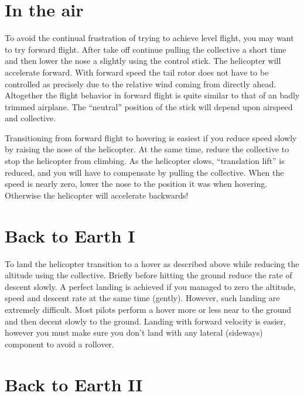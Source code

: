 \section{In the air}
 
To avoid the continual frustration of trying to achieve level flight, you may 
want to try forward flight. After take off continue pulling the collective a 
short time and then lower the nose a slightly using the control stick. The 
helicopter will accelerate forward. With forward speed the tail rotor does not 
have to be controlled as precisely due to the relative wind coming from 
directly ahead. Altogether the flight behavior in forward flight is quite 
similar to that of an badly trimmed airplane. The ``neutral'' position of the 
stick will depend upon airspeed and collective. 

Transitioning from forward flight to hovering is easiest if you reduce speed 
slowly by raising the nose of the helicopter. At the same time, reduce the 
collective to stop the helicopter from climbing. As the helicopter slows, 
``translation lift'' is reduced, and you will have to compensate by pulling 
the collective. When the speed is nearly zero, lower the nose to the position 
it was when hovering. Otherwise the helicopter will accelerate backwards! 

\section{Back to Earth I}
 
To land the helicopter transition to a hover as described above while reducing 
the altitude using the collective. Briefly before hitting the ground reduce 
the rate of descent slowly. A perfect landing is achieved if you managed to 
zero the altitude, speed and descent rate at the same time (gently). 
However, such landing are extremely difficult. Most pilots perform a hover 
more or less near to the ground and then decent slowly to the ground. Landing 
with forward velocity is easier, however you must make sure you don't land 
with any lateral (sideways) component to avoid a rollover. 


\section{Back to Earth II}

